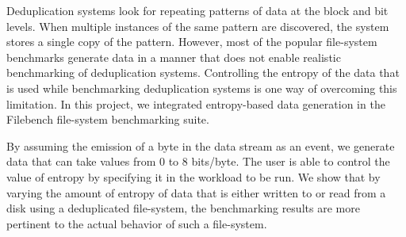 Deduplication systems look for repeating patterns of data at the block and bit levels. When multiple instances of the same pattern are discovered, the system stores a single copy of the pattern. However, most of the popular file-system benchmarks generate data in a manner that does not enable realistic benchmarking of deduplication systems. Controlling the entropy of the data that is used while benchmarking deduplication systems is one way of overcoming this limitation. In this project, we integrated entropy-based data generation in the Filebench file-system benchmarking suite.

By assuming the emission of a byte in the data stream as an event, we generate data that can take values from 0 to 8 bits/byte. The user is able to control the value of entropy by specifying it in the workload to be run. We show that by varying the amount of entropy of data that is either written to or read from a disk using a deduplicated file-system, the benchmarking results are more pertinent to the actual behavior of such a file-system.
